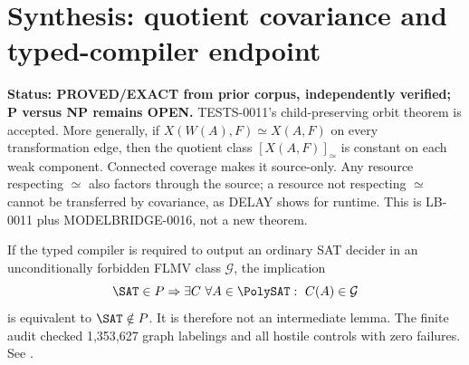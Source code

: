 \section{Synthesis: quotient covariance and typed-compiler endpoint}
\textbf{Status: PROVED/EXACT from prior corpus, independently verified; P versus NP remains OPEN.}
TESTS-0011's child-preserving orbit theorem is accepted.  More generally, if
\(X(W(A),F)\simeq X(A,F)\) on every transformation edge, then the quotient
class \([X(A,F)]_\simeq\) is constant on each weak component.  Connected
coverage makes it source-only.  Any resource respecting \(\simeq\) also
factors through the source; a resource not respecting \(\simeq\) cannot be
transferred by covariance, as DELAY shows for runtime.  This is LB-0011 plus
MODELBRIDGE-0016, not a new theorem.

If the typed compiler is required to output an ordinary SAT decider in an
unconditionally forbidden FLMV class \(\mathcal G\), the implication
\[
 \SAT\in P\Rightarrow
 \exists C\ \forall A\in\PolySAT:\ C(A)\in\mathcal G
\]
is equivalent to \(\SAT\notin P\).  It is therefore not an intermediate
lemma.  The finite audit checked 1,353,627 graph labelings and all hostile
controls with zero failures.  See
.
